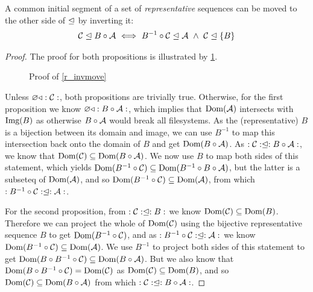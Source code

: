 \begin{mylem}\label{r_invmove}
A common initial segment of a set of \emph{representative} sequences can be moved to the other side of $\worksmeqsign$ by inverting it:
\begin{gather*}
\worksm{\seqset{C}}{B\cc \seqset{A}}
\ \Longleftrightarrow \ \worksm{B^{-1}\cc \seqset{C}}{\seqset{A}} 
\ \wedge \  \worksm{\seqset{C}}{\{B\}}
\end{gather*}
\end{mylem}
\begin{proof}

The proof for both propositions is illustrated by \cref{fig_invmove}.

\begin{figure}[htb]

\caption{Proof of \cref{r_invmove}}\label{fig_invmove}
\end{figure}

Unless $\works{\seqset{C}}$, both propositions are trivially true. Otherwise,
for the first proposition
we know $\works{B\cc\seqset{A}}$, which implies that $\Dom{\seqset{A}}$ intersects with $\Img{B}$ 
as otherwise $B\cc\seqset{A}$ would break all filesystems.
As the (representative) $B$ is a bijection between its domain and image,
we can use $B^{-1}$ to map this intersection back
onto the domain of $B$ and get $\Dom{B\cc\seqset{A}}$.
As $\worksc{B\cc \seqset{A}}{\seqset{C}}$, 
we know that $\Dom{\seqset{C}} \subseteq \Dom{B\cc\seqset{A}}$.
We now use $B$ to map both sides of this statement, which yields
$\Dom{B^{-1}\cc \seqset{C}} \subseteq \Dom{B^{-1}\cc B\cc\seqset{A}}$,
but the latter is a subseteq of $\Dom{\seqset{A}}$,
and so $\Dom{B^{-1}\cc \seqset{C}} \subseteq \Dom{\seqset{A}}$,
from which $\worksc{\seqset{A}}{B^{-1}\cc \seqset{C}}$.

For the second proposition, 
from $\worksc{B}{\seqset{C}}$ we know $\Dom{\seqset{C}} \subseteq \Dom{B}$.
Therefore we can project the whole of $\Dom{\seqset{C}}$ using the bijective representative sequence $B$
to get $\Dom{B^{-1}\cc\seqset{C}}$, and as $\worksc{\seqset{A}}{B^{-1}\cc \seqset{C}}$
we know
$\Dom{B^{-1}\cc\seqset{C}} \subseteq \Dom{\seqset{A}}$.
We use $B^{-1}$ to project both sides of this statement to get
$\Dom{B\cc B^{-1}\cc\seqset{C}} \subseteq \Dom{B\cc\seqset{A}}$.
But we also know that $\Dom{B\cc B^{-1}\cc\seqset{C}} = \Dom{\seqset{C}}$
as $\Dom{\seqset{C}} \subseteq \Dom{B}$,
and so $\Dom{\seqset{C}} \subseteq \Dom{B\cc\seqset{A}}$
from which $\worksc{B\cc \seqset{A}}{\seqset{C}}$.
\end{proof}


